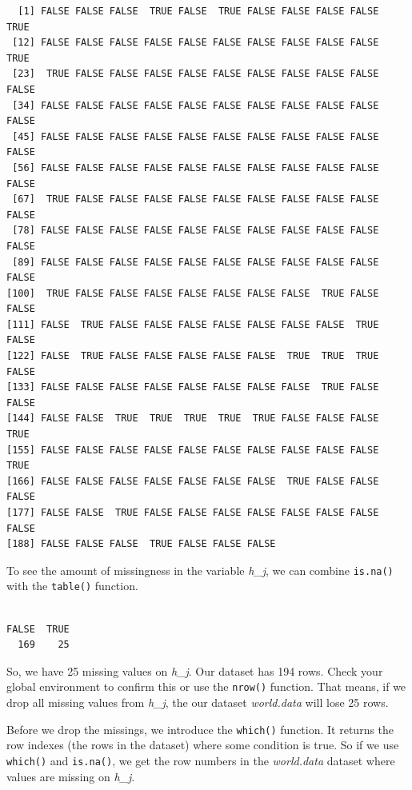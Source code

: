 \documentclass[]{book}
\newenvironment{Shaded}{\begin{snugshade}}{\end{snugshade}}
\newcommand{\KeywordTok}[1]{\textcolor[rgb]{0.13,0.29,0.53}{\textbf{#1}}}
\newcommand{\OperatorTok}[1]{\textcolor[rgb]{0.81,0.36,0.00}{\textbf{#1}}}
\newcommand{\NormalTok}[1]{#1}
\theoremstyle{definition}
\theoremstyle{definition}
\theoremstyle{definition}
\theoremstyle{remark}
\begin{document}
\begin{verbatim}
  [1] FALSE FALSE FALSE  TRUE FALSE  TRUE FALSE FALSE FALSE FALSE  TRUE
 [12] FALSE FALSE FALSE FALSE FALSE FALSE FALSE FALSE FALSE FALSE  TRUE
 [23]  TRUE FALSE FALSE FALSE FALSE FALSE FALSE FALSE FALSE FALSE FALSE
 [34] FALSE FALSE FALSE FALSE FALSE FALSE FALSE FALSE FALSE FALSE FALSE
 [45] FALSE FALSE FALSE FALSE FALSE FALSE FALSE FALSE FALSE FALSE FALSE
 [56] FALSE FALSE FALSE FALSE FALSE FALSE FALSE FALSE FALSE FALSE FALSE
 [67]  TRUE FALSE FALSE FALSE FALSE FALSE FALSE FALSE FALSE FALSE FALSE
 [78] FALSE FALSE FALSE FALSE FALSE FALSE FALSE FALSE FALSE FALSE FALSE
 [89] FALSE FALSE FALSE FALSE FALSE FALSE FALSE FALSE FALSE FALSE FALSE
[100]  TRUE FALSE FALSE FALSE FALSE FALSE FALSE FALSE  TRUE FALSE FALSE
[111] FALSE  TRUE FALSE FALSE FALSE FALSE FALSE FALSE FALSE  TRUE FALSE
[122] FALSE  TRUE FALSE FALSE FALSE FALSE FALSE  TRUE  TRUE  TRUE FALSE
[133] FALSE FALSE FALSE FALSE FALSE FALSE FALSE FALSE  TRUE FALSE FALSE
[144] FALSE FALSE  TRUE  TRUE  TRUE  TRUE  TRUE FALSE FALSE FALSE  TRUE
[155] FALSE FALSE FALSE FALSE FALSE FALSE FALSE FALSE FALSE FALSE  TRUE
[166] FALSE FALSE FALSE FALSE FALSE FALSE FALSE  TRUE FALSE FALSE FALSE
[177] FALSE FALSE  TRUE FALSE FALSE FALSE FALSE FALSE FALSE FALSE FALSE
[188] FALSE FALSE FALSE  TRUE FALSE FALSE FALSE
\end{verbatim}

To see the amount of missingness in the variable \emph{h\_j}, we can
combine \texttt{is.na()} with the \texttt{table()} function.

\begin{Shaded}
\end{Shaded}

\begin{verbatim}

FALSE  TRUE 
  169    25 
\end{verbatim}

So, we have 25 missing values on \emph{h\_j}. Our dataset has 194 rows.
Check your global environment to confirm this or use the \texttt{nrow()}
function. That means, if we drop all missing values from \emph{h\_j},
the our dataset \emph{world.data} will lose 25 rows.

Before we drop the missings, we introduce the \texttt{which()} function.
It returns the row indexes (the rows in the dataset) where some
condition is true. So if we use \texttt{which()} and \texttt{is.na()},
we get the row numbers in the \emph{world.data} dataset where values are
missing on \emph{h\_j}.
\end{document}
